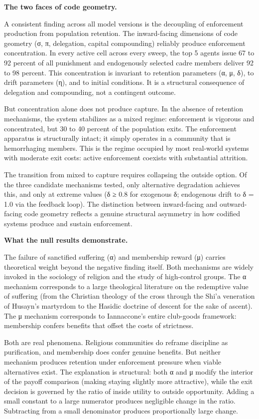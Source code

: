 \documentclass[12pt]{article}
\begin{document}
%

\textbf{The two faces of code geometry.}

A consistent finding across all model versions is the decoupling of enforcement production from population retention. The inward-facing dimensions of code geometry (σ, π, delegation, capital compounding) reliably produce enforcement concentration. In every active cell across every sweep, the top 5 agents issue 67 to 92 percent of all punishment and endogenously selected cadre members deliver 92 to 98 percent. This concentration is invariant to retention parameters (α, μ, δ), to drift parameters (η), and to initial conditions. It is a structural consequence of delegation and compounding, not a contingent outcome.

But concentration alone does not produce capture. In the absence of retention mechanisms, the system stabilizes as a mixed regime: enforcement is vigorous and concentrated, but 30 to 40 percent of the population exits. The enforcement apparatus is structurally intact; it simply operates in a community that is hemorrhaging members. This is the regime occupied by most real-world systems with moderate exit costs: active enforcement coexists with substantial attrition.

The transition from mixed to capture requires collapsing the outside option. Of the three candidate mechanisms tested, only alternative degradation achieves this, and only at extreme values (δ ≥ 0.8 for exogenous δ; endogenous drift to δ = 1.0 via the feedback loop). The distinction between inward-facing and outward-facing code geometry reflects a genuine structural asymmetry in how codified systems produce and sustain enforcement.

%

\textbf{What the null results demonstrate.}

The failure of sanctified suffering (α) and membership reward (μ) carries theoretical weight beyond the negative finding itself. Both mechanisms are widely invoked in the sociology of religion and the study of high-control groups. The α mechanism corresponds to a large theological literature on the redemptive value of suffering (from the Christian theology of the cross through the Shi'a veneration of Husayn's martyrdom to the Hasidic doctrine of descent for the sake of ascent). The μ mechanism corresponds to Iannaccone's entire club-goods framework: membership confers benefits that offset the costs of strictness.

Both are real phenomena. Religious communities do reframe discipline as purification, and membership does confer genuine benefits. But neither mechanism produces retention under enforcement pressure when viable alternatives exist. The explanation is structural: both α and μ modify the interior of the payoff comparison (making staying slightly more attractive), while the exit decision is governed by the ratio of inside utility to outside opportunity. Adding a small constant to a large numerator produces negligible change in the ratio. Subtracting from a small denominator produces proportionally large change.
\end{document}
